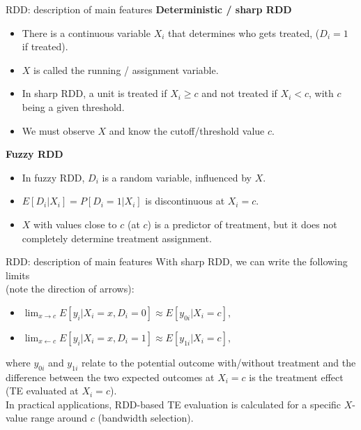 \documentclass{beamer}
\begin{document}
\begin{frame}{RDD: description of main features}
\textbf{Deterministic / sharp RDD}\\ \smallskip
\begin{itemize}
    \item There is a continuous variable $X_i$ that determines who gets treated, ($D_i = 1$ if treated). 
    \item $X$ is called the running / assignment variable.
    \item In sharp RDD, a unit is treated if $X_i \geq c$ and not treated if $X_i < c$, with $c$ being a given threshold.
    \item We must observe $X$ and know the cutoff/threshold value $c$.
\end{itemize}
\bigskip
\textbf{Fuzzy RDD}\\ \smallskip
\begin{itemize}
    \item In fuzzy RDD, $D_i$ is a random variable, influenced by $X$.
    \item $E[D_i|X_i] = P[D_i=1|X_i]$ is discontinuous at $X_i = c$.
    \item $X$ with values close to $c$ (at $c$) is a predictor of treatment, but it does not completely determine treatment assignment.
\end{itemize}
\end{frame}
\begin{frame}{RDD: description of main features}
With sharp RDD, we can write the following limits \\(note the direction of arrows):\\ \medskip
\begin{itemize}
    \item $\lim_{x\rightarrow c}E[y_i|X_i =x, D_i=0] \approx E[y_{0i}|X_i = c],$
    \medskip
    \item $\lim_{x \leftarrow c}E[y_i|X_i =x, D_i=1] \approx E[y_{1i}|X_i = c],$
\end{itemize} \medskip
where $y_{0i}$ and $y_{1i}$ relate to the potential outcome with/without treatment and the difference between the two expected outcomes at $X_i=c$ is the treatment effect (TE evaluated at $X_i=c$). \\ \bigskip
In practical applications, RDD-based TE evaluation is calculated for a specific $X$-value range around $c$ (bandwidth selection).
\end{frame}
\end{document}
